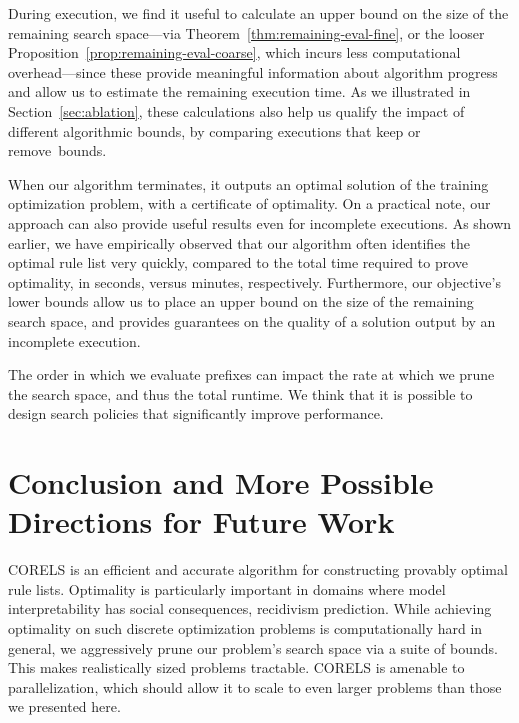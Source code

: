 \begin{arxiv}
During execution, we find it useful to calculate an upper bound on the
size of the remaining search space---\eg via Theorem~\ref{thm:remaining-eval-fine},
or the looser Proposition~\ref{prop:remaining-eval-coarse}, which incurs less
computational overhead---since these provide meaningful information about algorithm
progress and allow us to estimate the remaining execution time.
%
As we illustrated in Section~\ref{sec:ablation},
these calculations also help us qualify the impact of different algorithmic bounds,
\eg by comparing executions that keep or remove~bounds.

When our algorithm terminates, it outputs an optimal solution of the training optimization problem, with a certificate of optimality.
%
On a practical note, our approach can also provide useful results even for incomplete executions.
%
As shown earlier, we have empirically observed that our algorithm often identifies the optimal rule list
very quickly, compared to the total time required to prove optimality, \eg in seconds,
versus minutes, respectively.
%
Furthermore, our objective's lower bounds allow us to place an upper bound on the size of the remaining search space,
and provides guarantees on the quality of a solution output by an incomplete execution.

The order in which we evaluate prefixes can impact the rate at which we
prune the search space, and thus the total runtime. We think that it is possible to design search policies that significantly improve performance.

\end{arxiv}

\section{Conclusion and More Possible Directions for Future Work}

\begin{kdd}
CORELS is an efficient and accurate algorithm for constructing provably optimal rule lists.
%
Optimality is particularly important in domains where model interpretability
has social consequences, \eg recidivism prediction.
%
While achieving optimality on such discrete optimization problems is
computationally hard in general, we aggressively prune our problem's search space
via a suite of bounds.
%
This makes realistically sized problems tractable.
%
CORELS is amenable to parallelization, which should allow it to scale to
even larger problems than those we presented here.
\end{kdd}

